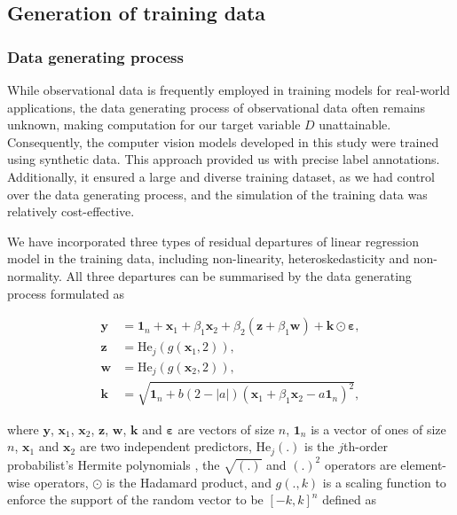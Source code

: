 \documentclass[]{interact}
\theoremstyle{plain}%
\theoremstyle{definition}
\theoremstyle{remark}
\begin{document}
\hypertarget{generation-of-training-data}{%
\subsection{Generation of training
data}\label{generation-of-training-data}}

\hypertarget{data-generating-process}{%
\subsubsection{Data generating process}\label{data-generating-process}}

While observational data is frequently employed in training models for
real-world applications, the data generating process of observational
data often remains unknown, making computation for our target variable
\(D\) unattainable. Consequently, the computer vision models developed
in this study were trained using synthetic data. This approach provided
us with precise label annotations. Additionally, it ensured a large and
diverse training dataset, as we had control over the data generating
process, and the simulation of the training data was relatively
cost-effective.

We have incorporated three types of residual departures of linear
regression model in the training data, including non-linearity,
heteroskedasticity and non-normality. All three departures can be
summarised by the data generating process formulated as

\begin{align}
\label{eq:data-sim}
\boldsymbol{y} &= \boldsymbol{1}_n + \boldsymbol{x}_1 + \beta_1\boldsymbol{x}_2 + \beta_2(\boldsymbol{z} + \beta_1\boldsymbol{w}) + \boldsymbol{k} \odot \boldsymbol{\varepsilon}, \\
\boldsymbol{z} &= \text{He}_j(g(\boldsymbol{x}_1, 2)), \\
\boldsymbol{w} &= \text{He}_j(g(\boldsymbol{x}_2, 2)), \\
\boldsymbol{k} &= \sqrt{\boldsymbol{1}_n + b(2 - |a|)(\boldsymbol{x}_1 + \beta_1\boldsymbol{x}_2 - a\boldsymbol{1}_n)^2},
\end{align}

\noindent where \(\boldsymbol{y}\), \(\boldsymbol{x}_1\),
\(\boldsymbol{x}_2\), \(\boldsymbol{z}\), \(\boldsymbol{w}\),
\(\boldsymbol{k}\) and \(\boldsymbol{\varepsilon}\) are vectors of size
\(n\), \(\boldsymbol{1}_n\) is a vector of ones of size \(n\),
\(\boldsymbol{x}_1\) and \(\boldsymbol{x}_2\) are two independent
predictors, \(\text{He}_j(.)\) is the \(j\)th-order probabilist's
Hermite polynomials \citep{hermite1864nouveau}, the \(\sqrt{(.)}\) and
\((.)^2\) operators are element-wise operators, \(\odot\) is the
Hadamard product, and \(g(., k)\) is a scaling function to enforce the
support of the random vector to be \([-k, k]^n\) defined as
\end{document}
